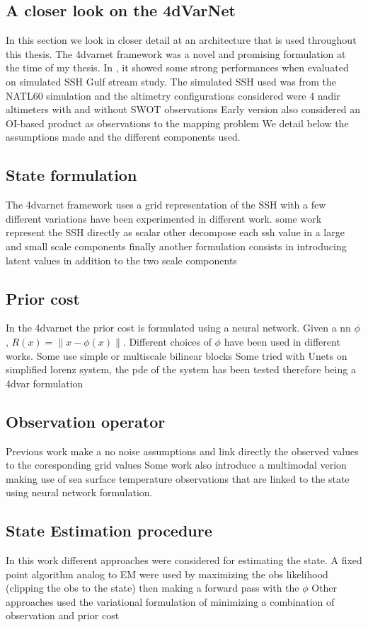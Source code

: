 \begin{bibunit}
\section{A closer look on the 4dVarNet}
In this section we look in closer detail at an architecture that is used throughout this thesis.
The 4dvarnet framework was a novel and promising  formulation at the time of my thesis. In \cite{}, it showed some strong performances when evaluated on simulated SSH Gulf stream study.
The simulated SSH used was from the NATL60 simulation and the altimetry configurations considered were 4 nadir altimeters with and without SWOT observations
Early version also considered an OI-based product as observations to the mapping problem
We detail below the assumptions made and the different components used.


\subsection{State formulation}
The 4dvarnet framework uses a grid representation of the SSH with a few different variations have been experimented in different work.
some work represent the SSH directly as scalar
other decompose each ssh value in a large and small scale components
finally another formulation consists in introducing latent values in addition to the two scale components 


\subsection{Prior cost}
In the 4dvarnet the prior cost is formulated using a neural network.
Given a nn $\phi$, $R(x)=\|x - \phi(x)\|$.
Different choices of $\phi$ have been used in different works.
Some use simple or multiscale bilinear blocks
Some tried with Unets
on simplified lorenz system, the pde of the system has been tested therefore being a 4dvar formulation



\subsection{Observation operator}
Previous work make a no noise assumptions and link directly the observed values to the coresponding grid values
Some work also introduce a multimodal verion making use of sea surface temperature observations that are linked to the state using neural network formulation.


\subsection{State Estimation procedure}
In this work different approaches were considered for  estimating the state.
A fixed point algorithm analog to EM were used by maximizing the obs likelihood (clipping the obs to the state) then making a forward pass with the $\phi$
Other approaches used the variational formulation of minimizing a combination of observation and prior cost



\end{bibunit}
